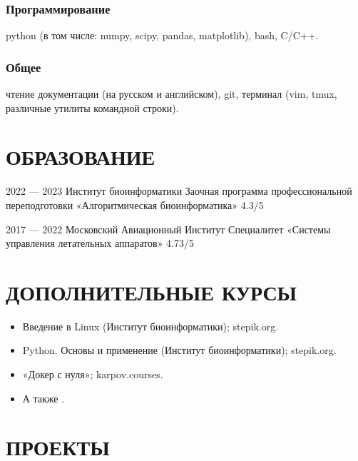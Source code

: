\documentclass[9pt]{article}
\begin{document}
    \subsubsection{Программирование}
    python (в том числе: numpy, scipy, pandas, matplotlib), bash, C/C++.
    
    \subsubsection{Общее}
    чтение документации (на русском и английском), git, терминал (vim, tmux, различные утилиты командной строки).
    
    \vspace{.5em}

\section{ОБРАЗОВАНИЕ}

    \learn
    {2022 --- 2023}
    {Институт биоинформатики}
    {Заочная программа профессиональной переподготовки}
    {«Алгоритмическая биоинформатика»}
    {4.3/5}
    
    \learn
    {2017 — 2022}
    {Московский Авиационный Институт}
    {Специалитет}
    {«Системы управления летательных аппаратов»}
    {4.73/5}

\section{ДОПОЛНИТЕЛЬНЫЕ КУРСЫ}

    \begin{itemize}
        \setlength\itemsep{-.5em}
        \item Введение в Linux (Институт биоинформатики); stepik.org.
        \item Python. Основы и применение (Институт биоинформатики); stepik.org.
        \item «Докер с нуля»; karpov.courses.
        \item А также .
    \end{itemize}
    
    \vspace{-.4em}

\section{ПРОЕКТЫ}
\end{document}
